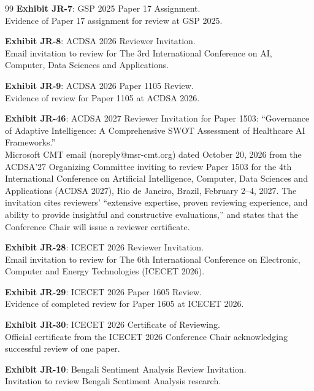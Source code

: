 \documentclass[11pt]{article}
\begin{document}
\begin{thebibliography}{99}
\textbf{Exhibit JR-7}: GSP 2025 Paper 17 Assignment.
\\Evidence of Paper 17 assignment for review at GSP 2025.

\textbf{Exhibit JR-8}: ACDSA 2026 Reviewer Invitation.
\\Email invitation to review for The 3rd International Conference on AI, Computer, Data Sciences and Applications.

\textbf{Exhibit JR-9}: ACDSA 2026 Paper 1105 Review.
\\Evidence of review for Paper 1105 at ACDSA 2026.

\textbf{Exhibit JR-46}: ACDSA 2027 Reviewer Invitation for Paper 1503: ``Governance of Adaptive Intelligence: A Comprehensive SWOT Assessment of Healthcare AI Frameworks.''
\\Microsoft CMT email (noreply@msr-cmt.org) dated October 20, 2026 from the ACDSA'27 Organizing Committee inviting \dr to review Paper 1503 for the 4th International Conference on Artificial Intelligence, Computer, Data Sciences and Applications (ACDSA 2027), Rio de Janeiro, Brazil, February 2--4, 2027. The invitation cites reviewers' ``extensive expertise, proven reviewing experience, and ability to provide insightful and constructive evaluations,'' and states that the Conference Chair will issue a reviewer certificate.

\textbf{Exhibit JR-28}: ICECET 2026 Reviewer Invitation.
\\Email invitation to review for The 6th International Conference on Electronic, Computer and Energy Technologies (ICECET 2026).

\textbf{Exhibit JR-29}: ICECET 2026 Paper 1605 Review.
\\Evidence of completed review for Paper 1605 at ICECET 2026.

\textbf{Exhibit JR-30}: ICECET 2026 Certificate of Reviewing.
\\Official certificate from the ICECET 2026 Conference Chair acknowledging \drs successful review of one paper.

\textbf{Exhibit JR-10}: Bengali Sentiment Analysis Review Invitation.
\\Invitation to review Bengali Sentiment Analysis research.


\end{thebibliography}
\end{document}
